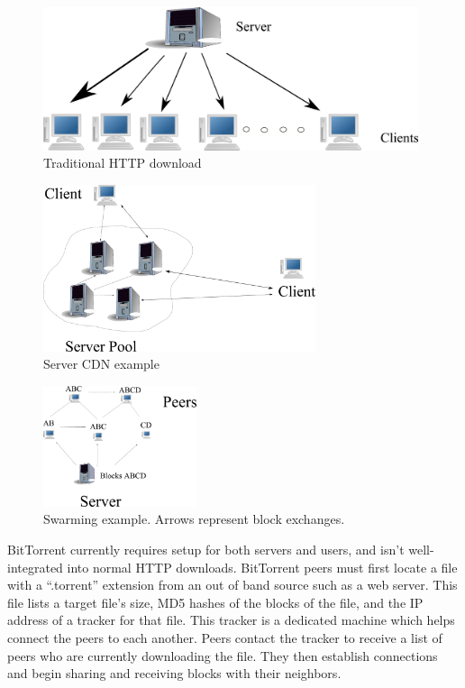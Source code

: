 \begin{figure}
\begin{center}
   \includegraphics[width=11cm]{description_pics/traditional_http.png}
    \caption{Traditional HTTP download}
 \label{fig:traditional_http}
 \end{center}
\end{figure}
\begin{figure}
    \centering
  \includegraphics[width=8cm]{description_pics/server_side_only.png}
  \caption{Server CDN example}
  \label{fig:server_only}
\end{figure}   
\begin{figure}
 \centering
 \includegraphics[width=4.5cm]{description_pics/normal_swarm.png}
 \caption{Swarming example.  Arrows represent block exchanges.}
 \label{fig:normal_swarm}
\end{figure}

BitTorrent currently requires setup for both servers and users, and isn't well-integrated into normal HTTP downloads.  BitTorrent peers must first locate a file with a ``.torrent'' extension from an out of band source such as a web server.  This file lists a target file's size, MD5 hashes of the blocks of the file, and the IP address of a tracker for that file.  This tracker is a dedicated machine which helps connect the peers to each another.  Peers contact the tracker to receive a list of peers who are currently downloading the file.  They then establish connections and begin sharing and receiving blocks with their neighbors.

